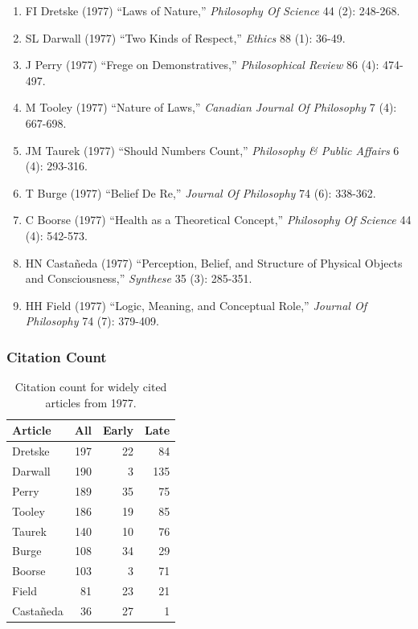 \documentclass[
  10pt,
  letterpaper,
  DIV=11,
  numbers=noendperiod,
  twoside]{scrartcl}
\providecommand{\tightlist}{%
  \setlength{\itemsep}{0pt}\setlength{\parskip}{0pt}}\usepackage{longtable,booktabs,array}
\begin{document}
\begin{enumerate}
\def\labelenumi{\arabic{enumi}.}
\tightlist
\item
  FI Dretske (1977) ``Laws of Nature,'' \emph{Philosophy Of Science} 44
  (2): 248-268.
\item
  SL Darwall (1977) ``Two Kinds of Respect,'' \emph{Ethics} 88 (1):
  36-49.
\item
  J Perry (1977) ``Frege on Demonstratives,'' \emph{Philosophical
  Review} 86 (4): 474-497.
\item
  M Tooley (1977) ``Nature of Laws,'' \emph{Canadian Journal Of
  Philosophy} 7 (4): 667-698.
\item
  JM Taurek (1977) ``Should Numbers Count,'' \emph{Philosophy \& Public
  Affairs} 6 (4): 293-316.
\item
  T Burge (1977) ``Belief De Re,'' \emph{Journal Of Philosophy} 74 (6):
  338-362.
\item
  C Boorse (1977) ``Health as a Theoretical Concept,'' \emph{Philosophy
  Of Science} 44 (4): 542-573.
\item
  HN Castañeda (1977) ``Perception, Belief, and Structure of Physical
  Objects and Consciousness,'' \emph{Synthese} 35 (3): 285-351.
\item
  HH Field (1977) ``Logic, Meaning, and Conceptual Role,'' \emph{Journal
  Of Philosophy} 74 (7): 379-409.
\end{enumerate}

\subsubsection*{Citation Count}\label{sec-count-1977}

\begin{longtable}[]{@{}lrrr@{}}

\caption{\label{tbl-citation-count-1977}Citation count for widely cited
articles from 1977.}

\tabularnewline

\toprule\noalign{}
Article & All & Early & Late \\
\midrule\noalign{}
\endhead
\bottomrule\noalign{}
\endlastfoot
Dretske & 197 & 22 & 84 \\
Darwall & 190 & 3 & 135 \\
Perry & 189 & 35 & 75 \\
Tooley & 186 & 19 & 85 \\
Taurek & 140 & 10 & 76 \\
Burge & 108 & 34 & 29 \\
Boorse & 103 & 3 & 71 \\
Field & 81 & 23 & 21 \\
Castañeda & 36 & 27 & 1 \\

\end{longtable}
\end{document}
